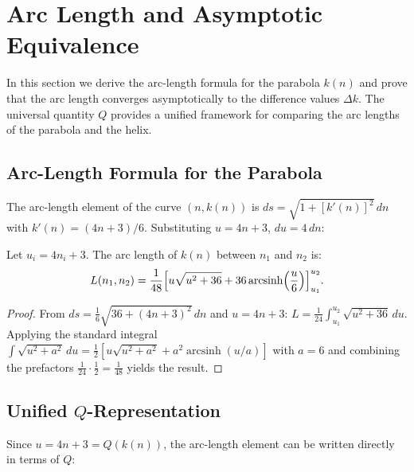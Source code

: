 \section{Arc Length and Asymptotic Equivalence}\label{sec:arclength}

In this section we derive the arc-length formula for the parabola $k(n)$
and prove that the arc length converges asymptotically to the
difference values $\Delta k$. The universal quantity $Q$ provides a
unified framework for comparing the arc lengths of the parabola and the
helix.

\subsection{Arc-Length Formula for the Parabola}

The arc-length element of the curve $(n, k(n))$ is
$ds = \sqrt{1 + [k'(n)]^2}\,dn$ with $k'(n) = (4n+3)/6$.
Substituting $u = 4n+3$, $du = 4\,dn$:

\begin{theorem}\label{thm:arc-length-parabola}
Let $u_i = 4n_i + 3$. The arc length of $k(n)$ between $n_1$ and $n_2$ is:
\begin{equation}\label{eq:arc-length-closed}
  L(n_1, n_2)
  = \frac{1}{48}\Bigl[u\sqrt{u^2+36}
    + 36\operatorname{arcsinh}\!\left(\frac{u}{6}\right)
    \Bigr]_{u_1}^{u_2}.
\end{equation}
\end{theorem}

\begin{proof}
From $ds = \frac{1}{6}\sqrt{36 + (4n+3)^2}\,dn$ and $u = 4n+3$:
$L = \frac{1}{24}\int_{u_1}^{u_2}\sqrt{u^2+36}\,du$.
Applying the standard integral
$\int\sqrt{u^2+a^2}\,du = \frac{1}{2}[u\sqrt{u^2+a^2} +
a^2\operatorname{arcsinh}(u/a)]$ with $a = 6$ and combining the
prefactors $\frac{1}{24}\cdot\frac{1}{2} = \frac{1}{48}$ yields the
result.
\end{proof}

\subsection{Unified \texorpdfstring{$Q$}{Q}-Representation}
\label{subsec:Q-arclength}

Since $u = 4n+3 = Q(k(n))$, the arc-length element can be written
directly in terms of $Q$:

